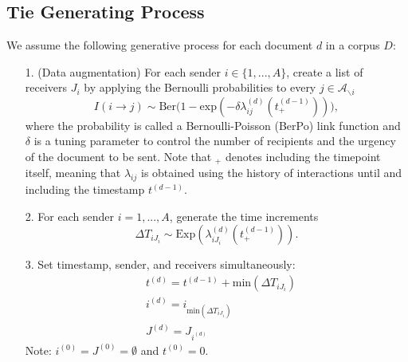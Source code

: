 \documentclass[a4paper]{article}
\begin{document}
\subsection{Tie Generating Process}\label{subsec: Tie Generating Process}
We assume the following generative process for each document $d$ in a corpus $D$:
\begin{itemize}
	\item[1.] (Data augmentation) For each sender $i \in \{1,...,A\}$, create a list of receivers $J_i$ by applying the Bernoulli probabilities to every $j \in \mathcal{A}_{\backslash i}$
	\begin{equation} I(i \rightarrow j) \sim \mbox{Ber}\Big(1-\mbox{exp}(-\delta\lambda^{(d)}_{ij}(t_+^{(d-1)}))\Big),
	\end{equation}
	where the probability is called a Bernoulli-Poisson (BerPo) link function \citep{zhou2015infinite} and $\delta$ is a tuning parameter to control the number of recipients and the urgency of the document to be sent. Note that $_+$ denotes including the timepoint itself, meaning that $\lambda_{ij}$ is obtained using the history of interactions until and including the timestamp $t^{(d-1)}$. \iffalse (i.e. $\lambda^{(d)}_{ij}(t_+^{(d-1)})=\sum\limits_{c=1}^{C} p^{(d)}_c\cdot\mbox{exp}\Big\{\boldsymbol{b}^{(c)T}\boldsymbol{x}^{(c)}_{t^{(d-1)}_+}(i, j)\Big\}\cdot 1\{j \in \mathcal{A}_{\backslash i}\}$)\fi
	\item[2.] For each sender $i = 1,...,A$, generate the time increments \begin{equation}
\Delta T_{i{J_i}} \sim \mbox{Exp}(\lambda_{i{J_i}}^{(d)}(t_+^{(d-1)})).
	\end{equation}
\iffalse	where $\lambda^{(d)}_{i{J_i}}(t_+^{(d-1)})= \sum\limits_{c=1}^{C} p^{(d)}_c\cdot\mbox{exp}\Big\{\sum\limits_{j \in{J_i}}\boldsymbol{b}^{(c)T}\boldsymbol{x}^{(c)}_{t^{(d-1)}_+}(i, j)\Big\}\cdot \prod\limits_{j \in J_i}1\{j \in \mathcal{A}_{\backslash i}\}$\fi
	 	 \item[3.] Set timestamp, sender, and receivers simultaneously:
	 	 \begin{equation}
	 	 \begin{aligned}
	 	 &t^{(d)} = t^{(d-1)}+\mbox{min}(\Delta T_{i{J_i}})\\
	 	  &i^{(d)} = i_{\mbox{min}(\Delta T_{i{J_i}})} \\
	 	  &J^{(d)} = J_{i^{(d)}}
	 	  \end{aligned}
	 	 \end{equation} Note: $i^{(0)}=J^{(0)}=\emptyset$ and $t^{(0)}=0$.
\end{itemize}
\end{document}
